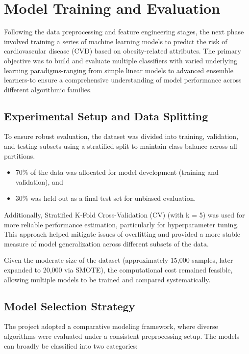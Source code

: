 \chapter{Model Training and Evaluation}\label{ch:model-training-and-evaluations}

Following the data preprocessing and feature engineering stages, the next phase involved training a series of machine learning models to predict the risk of cardiovascular disease (CVD) based on obesity-related attributes.
The primary objective was to build and evaluate multiple classifiers with varied underlying learning paradigms-ranging from simple linear models to advanced ensemble learners-to ensure a comprehensive understanding of model performance across different algorithmic families.


\section{Experimental Setup and Data Splitting}\label{sec:experimental-setup-and-data-splitting}
To ensure robust evaluation, the dataset was divided into training, validation, and testing subsets using a stratified split to maintain class balance across all partitions.

\begin{itemize}
    \item 70\% of the data was allocated for model development (training and validation), and
    \item 30\% was held out as a final test set for unbiased evaluation.
\end{itemize}

Additionally, Stratified K-Fold Cross-Validation (CV) (with k = 5) was used for more reliable performance estimation, particularly for hyperparameter tuning.
This approach helped mitigate issues of overfitting and provided a more stable measure of model generalization across different subsets of the data.

Given the moderate size of the dataset (approximately 15,000 samples, later expanded to 20,000 via SMOTE), the computational cost remained feasible, allowing multiple models to be trained and compared systematically.


\section{Model Selection Strategy}\label{sec:model-selection-strategy}
The project adopted a comparative modeling framework, where diverse algorithms were evaluated under a consistent preprocessing setup.
The models can broadly be classified into two categories:

